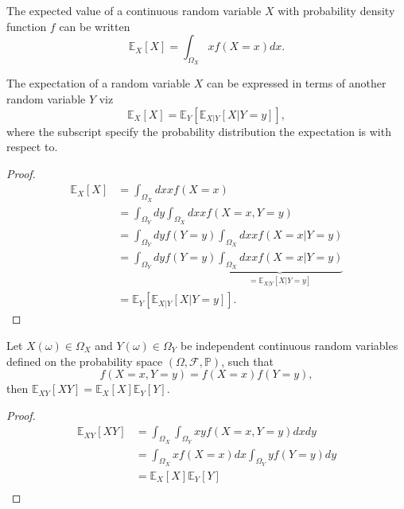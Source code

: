 \begin{theorem}
	\label{theorem:expectaion_continuous}
	The expected value of a continuous random variable $X$ with probability density function $f$ can be written 
	\begin{equation}
		\mathbb{E}_X[X]=\int_{\Omega_X}xf(X =x)dx.
	\end{equation}
\end{theorem}
\begin{theorem}
	\label{theorem:total_expectation}
	The expectation of a random variable $X$ can be expressed in terms of another random variable $Y$ viz
	\begin{equation}
			\mathbb{E}_X[X] = \mathbb{E}_Y[\mathbb{E}_{X|Y}[X|Y=y]],
	\end{equation}
	where the subscript specify the probability distribution the expectation is with respect to.
\end{theorem}
\begin{proof}
	\begin{equation}
		\begin{split}
			\mathbb{E}_X[X] &= \int_{\Omega_X} dx x f(X=x)\\
			& = \int_{\Omega_Y} dy\int_{\Omega_X}dx x f(X=x,Y=y)\\
			& =  \int_{\Omega_Y} dy f(Y=y) \int_{\Omega_X}dx x f(X=x|Y=y)\\
			& =  \int_{\Omega_Y} dy f(Y=y) \underbrace{\int_{\Omega_X}dx x f(X=x|Y=y)}_{= \mathbb{E}_{X|Y}[X|Y=y]}\\
			& = \mathbb{E}_Y[\mathbb{E}_{X|Y}[X|Y=y]].
		\end{split}
	\end{equation}
\end{proof}

\begin{theorem}
	\label{theorem:expectation_independent}
	Let $X(\omega)\in \Omega_X$ and $Y(\omega)\in \Omega_Y$ be independent continuous random variables defined on the probability space $(\Omega, \mathcal{F}, \mathbb{P})$, such that
	\begin{equation}
	f(X=x,Y=y)=f(X=x)f(Y=y),	
	\end{equation}
	then $\mathbb{E}_{XY}[XY]=\mathbb{E}_X[X]\mathbb{E}_Y[Y]$.
\end{theorem}

\begin{proof}
	\begin{equation}
		\begin{split}
			\mathbb{E}_{XY}[XY] &= \int_{\Omega_X}\int_{\Omega_Y} x y f(X=x,Y=y)dxdy\\
			&= \int_{\Omega_X} x f(X=x)dx\int_{\Omega_Y}yf(Y=y)dy\\
			&= \mathbb{E}_X[X]\mathbb{E}_Y[Y]\\
		\end{split}
	\end{equation}
\end{proof}

